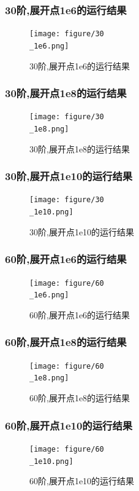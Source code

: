 \documentclass[12pt]{article}
\begin{document}
\begin{sloppypar}
\subsubsection{30阶,展开点1e6的运行结果}
\begin{figure}[H]
  \centering
  \texttt{[image: figure/30\\\_1e6.png]}
  \caption{30阶,展开点1e6的运行结果}
\end{figure}

\subsubsection{30阶,展开点1e8的运行结果}
\begin{figure}[H]
  \centering
  \texttt{[image: figure/30\\\_1e8.png]}
  \caption{30阶,展开点1e8的运行结果}
\end{figure}

\subsubsection{30阶,展开点1e10的运行结果}
\begin{figure}[H]
  \centering
  \texttt{[image: figure/30\\\_1e10.png]}
  \caption{30阶,展开点1e10的运行结果}
\end{figure}


\subsubsection{60阶,展开点1e6的运行结果}
\begin{figure}[H]
  \centering
  \texttt{[image: figure/60\\\_1e6.png]}
  \caption{60阶,展开点1e6的运行结果}
\end{figure}

\subsubsection{60阶,展开点1e8的运行结果}
\begin{figure}[H]
  \centering
  \texttt{[image: figure/60\\\_1e8.png]}
  \caption{60阶,展开点1e8的运行结果}
\end{figure}

\subsubsection{60阶,展开点1e10的运行结果}
\begin{figure}[H]
  \centering
  \texttt{[image: figure/60\\\_1e10.png]}
  \caption{60阶,展开点1e10的运行结果}
\end{figure}



\end{sloppypar}
\end{document}
